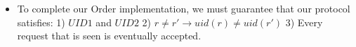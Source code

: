 \documentclass[a4paper]{article}
\begin{document}
\begin{itemize}
\begin{itemize}
\begin{itemize}
\item To complete our Order implementation, we must guarantee that our protocol satisfies: 1) $UID1$ and $UID2$ 2) $r \neq r' \rightarrow uid(r) \neq uid(r')$ 3) Every request that is seen is eventually accepted.


\end{itemize}
\end{itemize}

\end{itemize}









\end{document}

